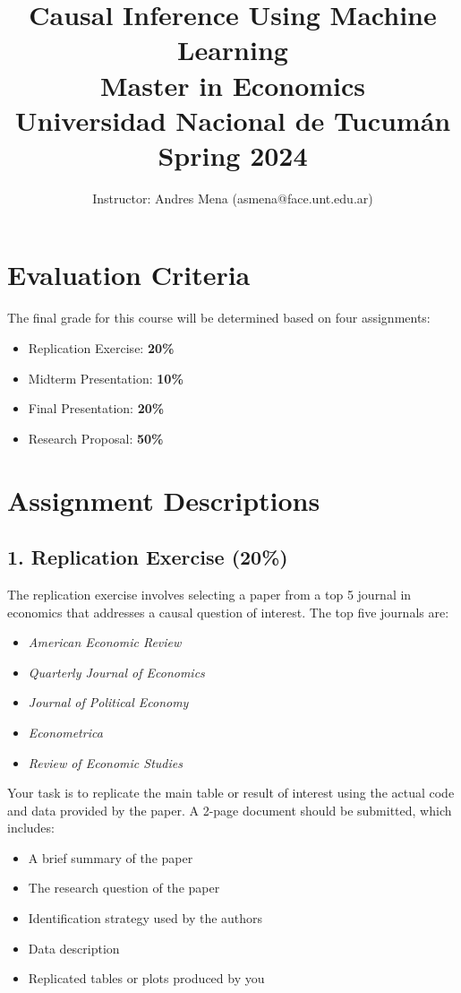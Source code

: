 \documentclass[12pt]{article}
\title{Causal Inference Using Machine Learning\\
Master in Economics\\
Universidad Nacional de Tucumán\\
Spring 2024}
\author{Instructor: Andres Mena (asmena@face.unt.edu.ar)}
\date{}
\begin{document}
\maketitle

\section*{Evaluation Criteria}

The final grade for this course will be determined based on four assignments:

\begin{itemize}
    \item Replication Exercise: \textbf{20\%}
    \item Midterm Presentation: \textbf{10\%}
    \item Final Presentation: \textbf{20\%}
    \item Research Proposal: \textbf{50\%}
\end{itemize}

\section*{Assignment Descriptions}

\subsection*{1. Replication Exercise (20\%)}
The replication exercise involves selecting a paper from a top 5 journal in economics that addresses a causal question of interest. The top five journals are:

\begin{itemize}
    \item \textit{American Economic Review}
    \item \textit{Quarterly Journal of Economics}
    \item \textit{Journal of Political Economy}
    \item \textit{Econometrica}
    \item \textit{Review of Economic Studies}
\end{itemize}

Your task is to replicate the main table or result of interest using the actual code and data provided by the paper. A 2-page document should be submitted, which includes:

\begin{itemize}
    \item A brief summary of the paper
    \item The research question of the paper
    \item Identification strategy used by the authors
    \item Data description
    \item Replicated tables or plots produced by you
\end{itemize}
\end{document}

